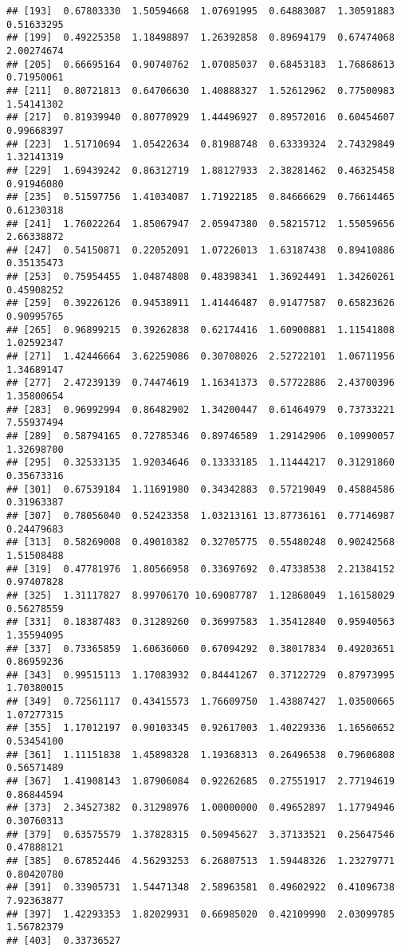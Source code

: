 \documentclass[
]{article}
\begin{document}
\begin{verbatim}
## [193]  0.67803330  1.50594668  1.07691995  0.64883087  1.30591883  0.51633295
## [199]  0.49225358  1.18498897  1.26392858  0.89694179  0.67474068  2.00274674
## [205]  0.66695164  0.90740762  1.07085037  0.68453183  1.76868613  0.71950061
## [211]  0.80721813  0.64706630  1.40888327  1.52612962  0.77500983  1.54141302
## [217]  0.81939940  0.80770929  1.44496927  0.89572016  0.60454607  0.99668397
## [223]  1.51710694  1.05422634  0.81988748  0.63339324  2.74329849  1.32141319
## [229]  1.69439242  0.86312719  1.88127933  2.38281462  0.46325458  0.91946080
## [235]  0.51597756  1.41034087  1.71922185  0.84666629  0.76614465  0.61230318
## [241]  1.76022264  1.85067947  2.05947380  0.58215712  1.55059656  2.66338872
## [247]  0.54150871  0.22052091  1.07226013  1.63187438  0.89410886  0.35135473
## [253]  0.75954455  1.04874808  0.48398341  1.36924491  1.34260261  0.45908252
## [259]  0.39226126  0.94538911  1.41446487  0.91477587  0.65823626  0.90995765
## [265]  0.96899215  0.39262838  0.62174416  1.60900881  1.11541808  1.02592347
## [271]  1.42446664  3.62259086  0.30708026  2.52722101  1.06711956  1.34689147
## [277]  2.47239139  0.74474619  1.16341373  0.57722886  2.43700396  1.35800654
## [283]  0.96992994  0.86482902  1.34200447  0.61464979  0.73733221  7.55937494
## [289]  0.58794165  0.72785346  0.89746589  1.29142906  0.10990057  1.32698700
## [295]  0.32533135  1.92034646  0.13333185  1.11444217  0.31291860  0.35673316
## [301]  0.67539184  1.11691980  0.34342883  0.57219049  0.45884586  0.31963387
## [307]  0.78056040  0.52423358  1.03213161 13.87736161  0.77146987  0.24479683
## [313]  0.58269008  0.49010382  0.32705775  0.55480248  0.90242568  1.51508488
## [319]  0.47781976  1.80566958  0.33697692  0.47338538  2.21384152  0.97407828
## [325]  1.31117827  8.99706170 10.69087787  1.12868049  1.16158029  0.56278559
## [331]  0.18387483  0.31289260  0.36997583  1.35412840  0.95940563  1.35594095
## [337]  0.73365859  1.60636060  0.67094292  0.38017834  0.49203651  0.86959236
## [343]  0.99515113  1.17083932  0.84441267  0.37122729  0.87973995  1.70380015
## [349]  0.72561117  0.43415573  1.76609750  1.43887427  1.03500665  1.07277315
## [355]  1.17012197  0.90103345  0.92617003  1.40229336  1.16560652  0.53454100
## [361]  1.11151838  1.45898328  1.19368313  0.26496538  0.79606808  0.56571489
## [367]  1.41908143  1.87906084  0.92262685  0.27551917  2.77194619  0.86844594
## [373]  2.34527382  0.31298976  1.00000000  0.49652897  1.17794946  0.30760313
## [379]  0.63575579  1.37828315  0.50945627  3.37133521  0.25647546  0.47888121
## [385]  0.67852446  4.56293253  6.26807513  1.59448326  1.23279771  0.80420780
## [391]  0.33905731  1.54471348  2.58963581  0.49602922  0.41096738  7.92363877
## [397]  1.42293353  1.82029931  0.66985020  0.42109990  2.03099785  1.56782379
## [403]  0.33736527
\end{verbatim}
\end{document}
